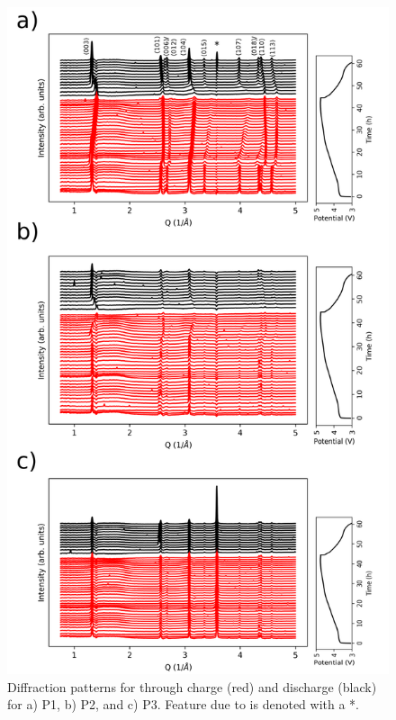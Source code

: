 \documentclass{article}
\begin{document}
\begin{figure}
\centering   
  \includegraphics[width=\linewidth, height=0.8\textheight, keepaspectratio]{figures/p1-3-xrd.png}
  \caption{Diffraction patterns for \nca{} through charge (red) and
    discharge (black) for a) P1, b) P2, and c) P3. Feature due to
     is denoted with a *.}
  \label{fig:xrd-echem}
\end{figure}
\end{document}
